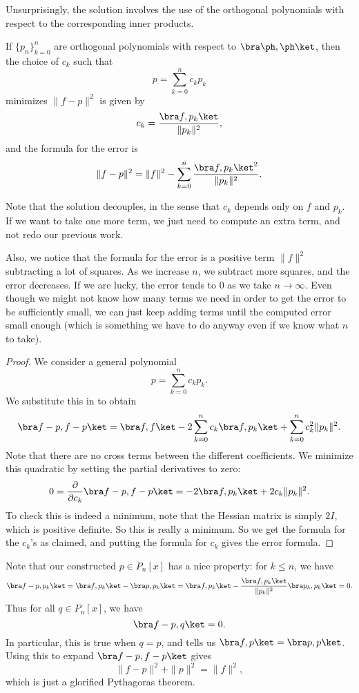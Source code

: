 \documentclass[a4paper]{article}
\begin{document}
Unsurprisingly, the solution involves the use of the orthogonal polynomials with respect to the corresponding inner products.
\begin{thm}
  If $\{p_n\}_{k = 0}^n$ are orthogonal polynomials with respect to $\bra \ph, \ph \ket$, then the choice of $c_k$ such that
  \[
    p = \sum_{k = 0}^n c_k p_k
  \]
  minimizes $\|f - p\|^2$ is given by
  \[
    c_k = \frac{\bra f, p_k\ket}{\|p_k\|^2},
  \]
  and the formula for the error is
  \[
    \|f - p\|^2 = \|f\|^2 - \sum_{k = 0}^n \frac{\bra f, p_k\ket^2}{\|p_k\|^2}.
  \]
\end{thm}
Note that the solution decouples, in the sense that $c_k$ depends only on $f$ and $p_k$. If we want to take one more term, we just need to compute an extra term, and not redo our previous work.

Also, we notice that the formula for the error is a positive term $\|f\|^2$ subtracting a lot of squares. As we increase $n$, we subtract more squares, and the error decreases. If we are lucky, the error tends to $0$ as we take $n \to \infty$. Even though we might not know how many terms we need in order to get the error to be sufficiently small, we can just keep adding terms until the computed error small enough (which is something we have to do anyway even if we know what $n$ to take).

\begin{proof}
  We consider a general polynomial
  \[
    p = \sum_{k = 0}^n c_k p_k.
  \]
  We substitute this in to obtain
  \[
    \bra f - p, f - p\ket = \bra f, f\ket - 2 \sum_{k = 0}^n c_k \bra f, p_k\ket + \sum_{k = 0}^n c_k^2 \|p_k\|^2.
  \]
  Note that there are no cross terms between the different coefficients. We minimize this quadratic by setting the partial derivatives to zero:
  \[
    0 = \frac{\partial}{\partial c_k} \bra f - p, f - p\ket = -2 \bra f, p_k\ket + 2c_k \|p_k\|^2.
  \]
  To check this is indeed a minimum, note that the Hessian matrix is simply $2I$, which is positive definite. So this is really a minimum. So we get the formula for the $c_k$'s as claimed, and putting the formula for $c_k$ gives the error formula.
\end{proof}

Note that our constructed $p \in P_n[x]$ has a nice property: for $k \leq n$, we have
\[
  \bra f - p, p_k\ket = \bra f, p_k\ket - \bra p, p_k\ket = \bra f, p_k\ket - \frac{\bra f, p_k\ket}{\|p_k\|^2} \bra p_k, p_k\ket = 0.
\]
Thus for all $q \in P_n[x]$, we have
\[
  \bra f - p, q\ket = 0.
\]
In particular, this is true when $q = p$, and tells us $\bra f, p\ket = \bra p, p\ket$. Using this to expand $\bra f - p, f - p\ket$ gives
\[
  \|f - p\|^2 + \|p\|^2 = \|f\|^2,
\]
which is just a glorified Pythagoras theorem.
\end{document}
